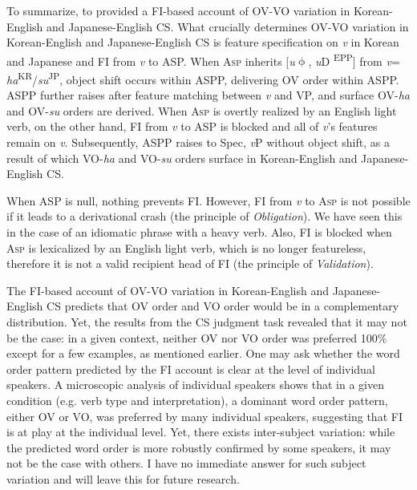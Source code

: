 To summarize,  to  provided a \ac{FI}-based account of \ac{OV}-\ac{VO} variation in Korean-English and Japanese-En\-glish \ac{CS}. What crucially determines \ac{OV}-\ac{VO} variation in Korean-English and Japanese-English \ac{CS} is feature specification on \textit{v} in Korean and Japanese and \ac{FI} from \textit{v} to \ac{ASP}. When \textsc{Asp} inherits [\textit{u}$\upphi$, \textit{u}D \textsuperscript{EPP}] from \textit{v}= \textit{ha}\textsuperscript{\MakeUppercase{kr}}/\textit{su}\textsuperscript{\MakeUppercase{jp}}, object shift occurs within \ac{ASP}P, delivering \ac{OV} order within \ac{ASP}P. \ac{ASP}P further raises after feature matching between \textit{v} and \acs{VP}, and surface \ac{OV}-\textit{ha} and \ac{OV}-\textit{su} orders are derived. When \textsc{Asp} is overtly realized by an English light verb, on the other hand, \ac{FI} from \textit{v} to \ac{ASP} is blocked and all of \textit{v}’s features remain on \textit{v}. Subsequently, \ac{ASP}P raises to Spec, \textit{v}P without object shift, as a result of which \ac{VO}-\textit{ha} and \ac{VO}-\textit{su} orders surface in Korean-English and Japanese-English \ac{CS}.

When \ac{ASP} is null, nothing prevents \ac{FI}. However, \ac{FI} from \textit{v} to \textsc{Asp} is not possible if it leads to a derivational crash (the principle of \textit{Obligation}). We have seen this in the case of an idiomatic phrase with a heavy verb. Also, \ac{FI} is blocked when \textsc{Asp} is lexicalized by an English light verb, which is no longer featureless, therefore it is not a valid recipient head of \ac{FI} (the principle of \textit{Validation}). 

The \ac{FI}-based account of \ac{OV}-\ac{VO} variation in Korean-English and Japanese-En\-glish \ac{CS} predicts that \ac{OV} order and \ac{VO} order would be in a complementary distribution. Yet, the results from the \ac{CS} judgment task revealed that it may not be the case: in a given context, neither \ac{OV} nor \ac{VO} order was preferred 100\% except for a few examples, as mentioned earlier. One may ask whether the word order pattern predicted by the \ac{FI} account is clear at the level of individual speakers. A microscopic analysis of individual speakers shows that in a given condition (e.g. verb type and interpretation), a dominant word order pattern, either \ac{OV} or \ac{VO}, was preferred by many individual speakers, suggesting that \ac{FI} is at play at the individual level. Yet, there exists inter-subject variation: while the predicted word order is more robustly confirmed by some speakers, it may not be the case with others. I have no immediate answer for such subject variation and will leave this for future research.

